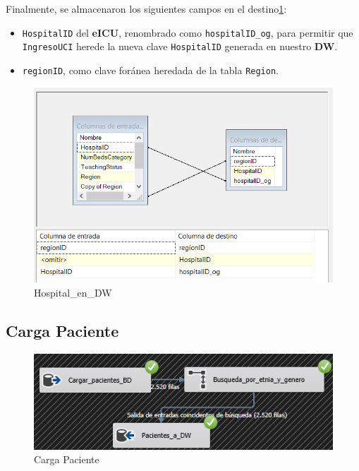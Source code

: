 \documentclass[12pt, a4paper, twoside]{article}
\begin{document}
	
	Finalmente, se almacenaron los siguientes campos en el destino\ref{fig:23}:
	
	\begin{itemize}
		\item \texttt{HospitalID} del \textbf{eICU}, renombrado como \texttt{hospitalID\_og}, para permitir que \texttt{IngresoUCI} herede la nueva clave \texttt{HospitalID} generada en nuestro \textbf{DW}.
		\item \texttt{regionID}, como clave foránea heredada de la tabla \texttt{Region}.
	\end{itemize}
	
	\begin{figure}[H]
		\centering
		\includegraphics[width=1\textwidth]{image/105_cargahospital_destino.png}
		\caption{Hospital\_en\_DW}
		\label{fig:23}
	\end{figure}

	
	\subsection{Carga Paciente}
	
	\begin{figure}[H]
		\centering
		\includegraphics[width=1\textwidth]{image/108_carga_paciente.png}
		\caption{Carga Paciente}
		\label{fig:17}
	\end{figure}
	
\end{document}
